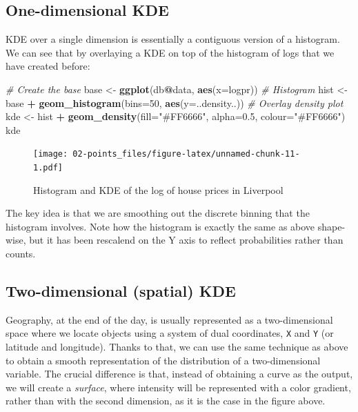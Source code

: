 \documentclass[]{book}
\newenvironment{Shaded}{\begin{snugshade}}{\end{snugshade}}
\newcommand{\KeywordTok}[1]{\textcolor[rgb]{0.13,0.29,0.53}{\textbf{#1}}}
\newcommand{\DataTypeTok}[1]{\textcolor[rgb]{0.13,0.29,0.53}{#1}}
\newcommand{\DecValTok}[1]{\textcolor[rgb]{0.00,0.00,0.81}{#1}}
\newcommand{\FloatTok}[1]{\textcolor[rgb]{0.00,0.00,0.81}{#1}}
\newcommand{\StringTok}[1]{\textcolor[rgb]{0.31,0.60,0.02}{#1}}
\newcommand{\CommentTok}[1]{\textcolor[rgb]{0.56,0.35,0.01}{\textit{#1}}}
\newcommand{\OperatorTok}[1]{\textcolor[rgb]{0.81,0.36,0.00}{\textbf{#1}}}
\newcommand{\NormalTok}[1]{#1}
\begin{document}
\subsection{One-dimensional KDE}\label{one-dimensional-kde}

KDE over a single dimension is essentially a contiguous version of a
histogram. We can see that by overlaying a KDE on top of the histogram
of logs that we have created before:

\begin{Shaded}
\begin{Highlighting}[]
\CommentTok{# Create the base}
\NormalTok{base <-}\StringTok{ }\KeywordTok{ggplot}\NormalTok{(db}\OperatorTok{@}\NormalTok{data, }\KeywordTok{aes}\NormalTok{(}\DataTypeTok{x=}\NormalTok{logpr))}
\CommentTok{# Histogram}
\NormalTok{hist <-}\StringTok{ }\NormalTok{base }\OperatorTok{+}\StringTok{ }
\StringTok{  }\KeywordTok{geom_histogram}\NormalTok{(}\DataTypeTok{bins=}\DecValTok{50}\NormalTok{, }\KeywordTok{aes}\NormalTok{(}\DataTypeTok{y=}\NormalTok{..density..))}
\CommentTok{# Overlay density plot}
\NormalTok{kde <-}\StringTok{ }\NormalTok{hist }\OperatorTok{+}\StringTok{ }
\StringTok{  }\KeywordTok{geom_density}\NormalTok{(}\DataTypeTok{fill=}\StringTok{"#FF6666"}\NormalTok{, }\DataTypeTok{alpha=}\FloatTok{0.5}\NormalTok{, }\DataTypeTok{colour=}\StringTok{"#FF6666"}\NormalTok{)}
\NormalTok{kde}
\end{Highlighting}
\end{Shaded}

\begin{figure}
\centering
\texttt{[image: 02-points\_files/figure-latex/unnamed-chunk-11-1.pdf]}
\caption{\label{fig:unnamed-chunk-11}Histogram and KDE of the log of house
prices in Liverpool}
\end{figure}

The key idea is that we are smoothing out the discrete binning that the
histogram involves. Note how the histogram is exactly the same as above
shape-wise, but it has been rescalend on the Y axis to reflect
probabilities rather than counts.

\subsection{Two-dimensional (spatial)
KDE}\label{two-dimensional-spatial-kde}

Geography, at the end of the day, is usually represented as a
two-dimensional space where we locate objects using a system of dual
coordinates, \texttt{X} and \texttt{Y} (or latitude and longitude).
Thanks to that, we can use the same technique as above to obtain a
smooth representation of the distribution of a two-dimensional variable.
The crucial difference is that, instead of obtaining a curve as the
output, we will create a \emph{surface}, where intensity will be
represented with a color gradient, rather than with the second
dimension, as it is the case in the figure above.
\end{document}
